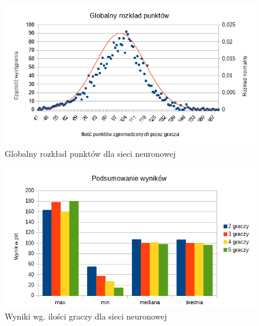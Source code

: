 \documentclass[12pt, oneside]{report}
\begin{document}
\begin{figure}[h]
	\includegraphics[width=\linewidth]{GaussNNWykrespunktowglobal.png}
	\caption{Globalny rozkład punktów dla sieci neuronowej}
	\label{figure:global_points_nn}
\end{figure}

\begin{figure}[h]
	\includegraphics[width=\linewidth]{NNWynikWPkt.png}
	\caption{Wyniki wg. ilości graczy dla sieci neuronowej}
	\label{figure:min_max_nn}
\end{figure}
\end{document}
